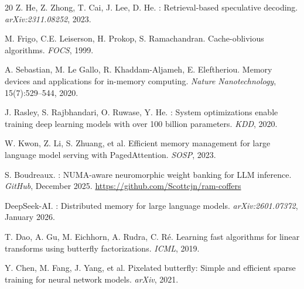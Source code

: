 \documentclass[10pt,twocolumn]{article}
\begin{document}
\begin{thebibliography}{20}
Z. He, Z. Zhong, T. Cai, J. Lee, D. He.
: Retrieval-based speculative decoding.
\newblock \emph{arXiv:2311.08252}, 2023.

M. Frigo, C.E. Leiserson, H. Prokop, S. Ramachandran.
\newblock Cache-oblivious algorithms.
\newblock \emph{FOCS}, 1999.

A. Sebastian, M. Le Gallo, R. Khaddam-Aljameh, E. Eleftheriou.
\newblock Memory devices and applications for in-memory computing.
\newblock \emph{Nature Nanotechnology}, 15(7):529--544, 2020.

J. Rasley, S. Rajbhandari, O. Ruwase, Y. He.
: System optimizations enable training deep learning models with over 100 billion parameters.
\newblock \emph{KDD}, 2020.

W. Kwon, Z. Li, S. Zhuang, et al.
\newblock Efficient memory management for large language model serving with {PagedAttention}.
\newblock \emph{SOSP}, 2023.

S. Boudreaux.
: {NUMA}-aware neuromorphic weight banking for {LLM} inference.
\newblock \emph{GitHub}, December 2025.
\newblock \url{https://github.com/Scottcjn/ram-coffers}

DeepSeek-AI.
: Distributed memory for large language models.
\newblock \emph{arXiv:2601.07372}, January 2026.

T. Dao, A. Gu, M. Eichhorn, A. Rudra, C. R\'{e}.
\newblock Learning fast algorithms for linear transforms using butterfly factorizations.
\newblock \emph{ICML}, 2019.

Y. Chen, M. Fang, J. Yang, et al.
\newblock Pixelated butterfly: Simple and efficient sparse training for neural network models.
\newblock \emph{arXiv}, 2021.

\end{thebibliography}
\end{document}

